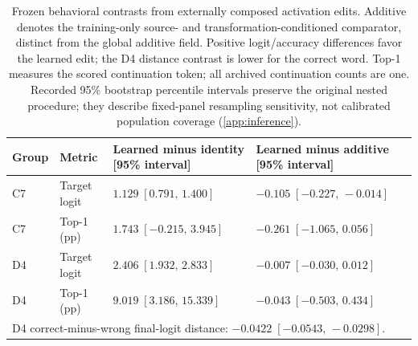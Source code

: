 \begin{table}[t]
\centering
\small
\begin{tabular}{llll}
\toprule
Group & Metric & Learned minus identity [95\% interval] & Learned minus additive [95\% interval] \\
\midrule
C7 & Target logit & $1.129\;[0.791,\,1.400]$ & $-0.105\;[-0.227,\,-0.014]$ \\
C7 & Top-1 (pp) & $1.743\;[-0.215,\,3.945]$ & $-0.261\;[-1.065,\,0.056]$ \\
D4 & Target logit & $2.406\;[1.932,\,2.833]$ & $-0.007\;[-0.030,\,0.012]$ \\
D4 & Top-1 (pp) & $9.019\;[3.186,\,15.339]$ & $-0.043\;[-0.503,\,0.434]$ \\
\midrule
\multicolumn{4}{l}{D4 correct-minus-wrong final-logit distance: $-0.0422\;[-0.0543,\,-0.0298]$.} \\
\bottomrule
\end{tabular}
\caption{Frozen behavioral contrasts from externally composed activation edits. Additive denotes the training-only source- and transformation-conditioned comparator, distinct from the global additive field. Positive logit/accuracy differences favor the learned edit; the D4 distance contrast is lower for the correct word. Top-1 measures the scored continuation token; all archived continuation counts are one. Recorded 95\% bootstrap percentile intervals preserve the original nested procedure; they describe fixed-panel resampling sensitivity, not calibrated population coverage (\cref{app:inference}).}
\label{tab:causal-main}
\end{table}
